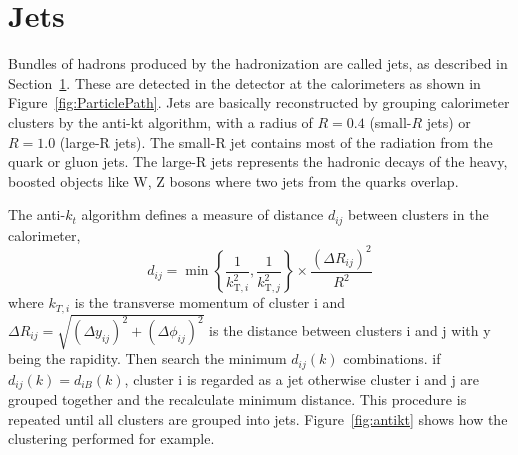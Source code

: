 \begin{table}[ht]
 \label{tab:muon_selection}
 \caption{Summary of muon selection used in this analysis}
\end{table}

\section{Jets}
Bundles of hadrons produced by the hadronization are called jets, as described in Section~\ref{}.
These are detected in the detector at the calorimeters as shown in Figure~\ref{fig:ParticlePath}.
Jets are basically reconstructed by grouping calorimeter clusters by the anti-kt algorithm\cite{Cacciari_2008}, with a radius of $R = 0.4$ (small-$R$ jets) or $R = 1.0$ (large-R jets). The small-R jet contains most of the radiation from the quark or gluon jets. The large-R jets represents the hadronic decays of the heavy, boosted objects like W, Z bosons where two jets from the quarks overlap.

The anti-$k_t$ algorithm defines a measure of distance $d_{ij}$ between clusters in the calorimeter,
\begin{equation}
d_{i j}=\min \left\{\frac{1}{k_{\mathrm{T}, i}^{2}}, \frac{1}{k_{\mathrm{T}, j}^{2}}\right\} \times \frac{\left(\Delta R_{i j}\right)^{2}}{R^{2}}
\end{equation}
where $k_{T,i}$ is the transverse momentum of cluster i and $\Delta R_{i j}=\sqrt{\left(\Delta y_{i j}\right)^{2}+\left(\Delta \phi_{i j}\right)^{2}}$ is the distance between clusters i and j with y being the rapidity. Then search the minimum $d_{i j}(k)$ combinations. if $d_{i j}(k) = d_{i B}(k)$, cluster i is regarded as a jet otherwise cluster i and j are grouped together and the recalculate minimum distance. This procedure is repeated until all clusters are grouped into jets.
Figure~\ref{fig:antikt} shows how the clustering performed for example.

